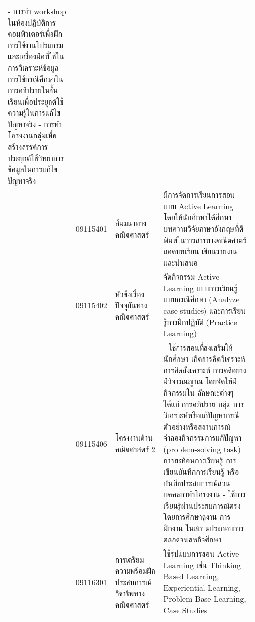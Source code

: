 {\begin{center}
\begin{longtable}{|p{}|p{}|p{}|p{}|}
	\newline- การทำ workshop ในห้องปฏิบัติการคอมพิวเตอร์เพื่อฝึกการใช้งานโปรแกรมและเครื่องมือที่ใช้ในการวิเคราะห์ข้อมูล
	\newline- การใช้กรณีศึกษาในการอภิปรายในชั้นเรียนเพื่อประยุกต์ใช้ความรู้ในการแก้ไขปัญหาจริง
	\newline- การทำโครงงานกลุ่มเพื่อสร้างสรรค์การประยุกต์ใช้วิทยาการข้อมูลในการแก้ไขปัญหาจริง		      
	\\  
	\cline{2-4}
	& 09115401 &ส้มมนาทางคณิตศาสตร์ &
	มีการจัดการเรียนการสอนแบบ Active Learning โดยให้นักศึกษาได้ศึกษาบทความวิจัยภาษาอังกฤษที่ตีพิมพ์ในวารสารทางคณิตศาตร์ ถอดบทเรียน เขียนรายงานและนำเสนอ	      
	\\  
	\cline{2-4}
	& 09115402 & หัวข้อเรื่องปัจจุบันทางคณิตศาสตร์ &
	จัดกิจกรรม Active Learning แบบการเรียนรู้แบบกรณีศึกษา (Analyze case studies) และการเรียนรู้การฝึกปฏิบัติ (Practice Learning)    
	\\
	\cline{2-4}
	& 09115406 & โครงงานด้านคณิตศาสตร์ 2 &
	-	ใช้การสอนที่ส่งเสริมให้นักศึกษา เกิดการคิดวิเคราะห์ การคิดสังเคราะห์ การคดิอย่างมีวิจารณญาณ โดยจัดให้มีกิจกรรมใน ลักษณะต่างๆ ได้แก่ การอภิปราย กลุ่ม การวิเคราะห์หรือแก้ปัญหากรณีตัวอย่างหรือสถานการณ์จำลองกิจกรรมการแก้ปัญหา (problem-solving task) การสะท้อนการเรียนรู้ การเขียนบันทึกการเรียนรู้ หรือบันทึกประสบการณ์ส่วน บุคคลกาทําโครงงาน 
	\newline-	ใช้การเรียนรู้ผ่านประสบการณ์ตรง โดยการศึกษาดูงาน การฝึกงาน ในสถานประกอบการตลอดจนสหกิจศึกษา 
	\\  
	\cline{2-4}
	& 09116301 & การเตรียมความพร้อมฝึกประสบการณ์วิชาชีพทางคณิตศาสตร์ &
	ใช้รูปแบบการสอน Active Learning เช่น Thinking Based Learning, Experiential Learning, Problem Base Learning, Case Studies 
	\\  
	
	\hline
	
\end{longtable}
\end{center}




%



\begin{doclist}
\end{doclist}


}
